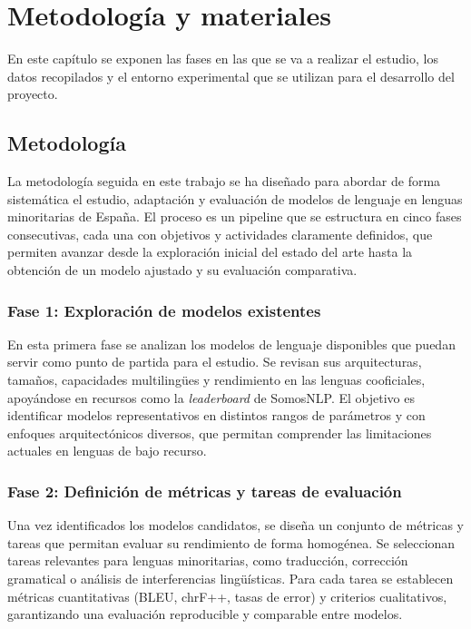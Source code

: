 \chapter{Metodología y materiales}
\label{ch:inicioIR}

En este capítulo se exponen las fases en las que se va a realizar el estudio, los datos recopilados y el entorno experimental que se utilizan para el desarrollo del proyecto.
\section{Metodología}

La metodología seguida en este trabajo se ha diseñado para abordar de forma sistemática el estudio, adaptación y evaluación de modelos de lenguaje en lenguas minoritarias de España. El proceso es un pipeline que se estructura en cinco fases consecutivas, cada una con objetivos y actividades claramente definidos, que permiten avanzar desde la exploración inicial del estado del arte hasta la obtención de un modelo ajustado y su evaluación comparativa.

\subsection*{Fase 1: Exploración de modelos existentes}
En esta primera fase se analizan los modelos de lenguaje disponibles que puedan servir como punto de partida para el estudio. Se revisan sus arquitecturas, tamaños, capacidades multilingües y rendimiento en las lenguas cooficiales, apoyándose en recursos como la \textit{leaderboard} de SomosNLP. El objetivo es identificar modelos representativos en distintos rangos de parámetros y con enfoques arquitectónicos diversos, que permitan comprender las limitaciones actuales en lenguas de bajo recurso.

\subsection*{Fase 2: Definición de métricas y tareas de evaluación}
Una vez identificados los modelos candidatos, se diseña un conjunto de métricas y tareas que permitan evaluar su rendimiento de forma homogénea. Se seleccionan tareas relevantes para lenguas minoritarias, como traducción, corrección gramatical o análisis de interferencias lingüísticas. Para cada tarea se establecen métricas cuantitativas (BLEU, chrF++, tasas de error) y criterios cualitativos, garantizando una evaluación reproducible y comparable entre modelos.

